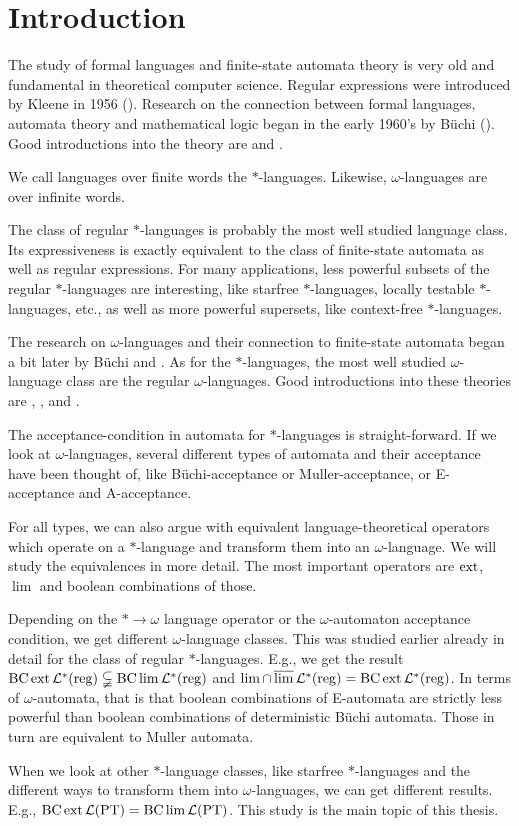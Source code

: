
\section{Introduction}

The study of formal languages and finite-state automata theory is very old and fundamental in theoretical computer science. Regular expressions were introduced by Kleene in 1956 (\cite{Kleene56}). Research on the connection between formal languages, automata theory and mathematical logic began in the early 1960's by Büchi (\cite{Buchi60}). Good introductions into the theory are \cite{FinAutLogR109} and \cite{LangAutLogicR102}.

We call languages over finite words the $*$-languages. Likewise, $\omega$-languages are over infinite words.

The class of regular $*$-languages is probably the most well studied language class. Its expressiveness is exactly equivalent to the class of finite-state automata as well as regular expressions. For many applications, less powerful subsets of the regular $*$-languages are interesting, like starfree $*$-languages, locally testable $*$-languages, etc., as well as more powerful supersets, like context-free $*$-languages.

The research on $\omega$-languages and their connection to finite-state automata began a bit later by Büchi \cite{DecisionSOR111} and \cite{Muller63}. As for the $*$-languages, the most well studied $\omega$-language class are the regular $\omega$-languages. Good introductions into these theories are \cite{AutInfObjsR103}, \cite{InfCompR101}, \cite{OmLangR108} and \cite{InfWordsR110}.

The acceptance-condition in automata for $*$-languages is straight-forward. If we look at $\omega$-languages, several different types of automata and their acceptance have been thought of, like Büchi-acceptance or Muller-acceptance, or E-acceptance and A-acceptance.

For all types, we can also argue with equivalent language-theoretical operators which operate on a $*$-language and transform them into an $\omega$-language. We will study the equivalences in more detail. The most important operators are $\operatorname{ext}$, $\lim$ and boolean combinations of those.

Depending on the $* \rightarrow \omega$ language operator or the $\omega$-automaton acceptance condition, we get different $\omega$-language classes. This was studied earlier already in detail for the class of regular $*$-languages. E.g., we get the result $\operatorname{BC} \operatorname{ext} \mathcal{L}^*(\textup{\textrm{reg}}) \subsetneqq \operatorname{BC} \lim \mathcal{L}^*(\textup{\textrm{reg}})$ and $\lim \cap \operatorname{\overline{lim}} \mathcal{L}^*(\textup{\textrm{reg}}) = \operatorname{BC} \operatorname{ext} \mathcal{L}^*(\textup{\textrm{reg}})$. In terms of $\omega$-automata, that is that boolean combinations of E-automata are strictly less powerful than boolean combinations of deterministic Büchi automata. Those in turn are equivalent to Muller automata.

When we look at other $*$-language classes, like starfree $*$-languages and the different ways to transform them into $\omega$-languages, we can get different results. E.g., $\operatorname{BC} \operatorname{ext} \mathcal{L}(\textup{\textrm{PT}}) = \operatorname{BC} \lim \mathcal{L}(\textup{\textrm{PT}})$. This study is the main topic of this thesis.
